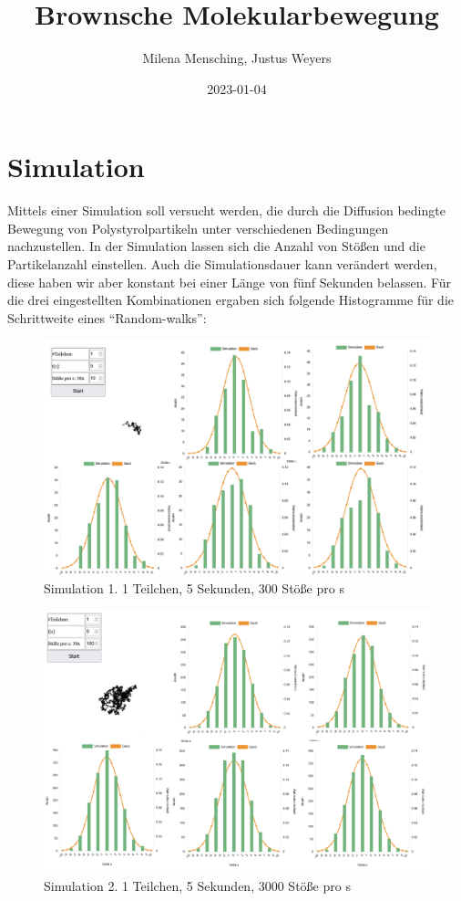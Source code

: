 \documentclass[
  9pt,
]{article}
\title{Brownsche Molekularbewegung}
\author{Milena Mensching, Justus Weyers}
\date{2023-01-04}
\begin{document}
\maketitle

\hypertarget{simulation}{%
\section{Simulation}\label{simulation}}

Mittels einer Simulation soll versucht werden, die durch die Diffusion
bedingte Bewegung von Polystyrolpartikeln unter verschiedenen
Bedingungen nachzustellen. In der Simulation lassen sich die Anzahl von
Stößen und die Partikelanzahl einstellen. Auch die Simulationsdauer kann
verändert werden, diese haben wir aber konstant bei einer Länge von fünf
Sekunden belassen. Für die drei eingestellten Kombinationen ergaben sich
folgende Histogramme für die Schrittweite eines ``Random-walks'':

\begin{figure}
\centering
\includegraphics[width=\textwidth,height=0.25\textheight]{Daten/a.png}
\caption{Simulation 1. 1 Teilchen, 5 Sekunden, 300 Stöße pro s}
\end{figure}

\begin{figure}
\centering
\includegraphics[width=\textwidth,height=0.25\textheight]{Daten/b2.png}
\caption{Simulation 2. 1 Teilchen, 5 Sekunden, 3000 Stöße pro s}
\end{figure}
\end{document}
